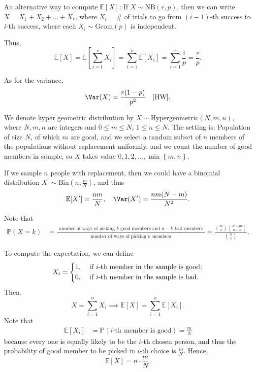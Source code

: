 An alternative way to compute \(\mathbb{E} [X]\): If \(X \sim \mathrm{NB}(r, p) \), then we can write \(X = X_1 + X_2 + \dots + X_r\), where \(X_i = \#\) of trials to go from \((i-1)\)-th success to \(i\)-th success, where each \(X_i \sim \mathrm{Geom}(p) \) is independent. 

Thus, 
\[
    \mathbb{E} [X] = \mathbb{E} \left[ \sum_{i=1}^r X_i  \right] = \sum_{i=1}^r \mathbb{E} [X_i] = \sum_{i=1}^r \frac{1}{p} = \frac{r}{p}.   
\]

As for the variance,
\[
    \Var(X) = \frac{r(1 - p)}{p^2} \quad [\text{HW}]. 
\]

\begin{definition}
    We denote hyper geometric distribution by \(X \sim \mathrm{Hypergeometric}(N, m, n) \), where \(N, m, n\) are integers and \(0 \le m \le N\), \(1 \le n \le N\). The setting is: Population of size \(N\), of which \(m\) are good, and we select a random subset of \(n\) members of the populations without replacement uniformly, and we count the number of good members in sample, so \(X\) takes value \(0, 1, 2, \dots , \min \left\{ m, n \right\} \).      
\end{definition}

\begin{observation}
    If we sample \(n\) people with replacement, then we could have a binomial distribution \(X^{\prime} \sim \mathrm{Bin}(n, \frac{m}{N})\), and thus 
    \[
        \mathbb{E} [X^{\prime} ] = \frac{nm}{N}, \quad \Var(X^{\prime} ) = \frac{nm(N - m)}{N^2}.
    \]  
\end{observation}

Note that 
\begin{align*}
    \mathbb{P} (X = k) &= \frac{\substack{\text{number of ways of picking } k \text{ good members and } n - k \text{ bad members}   } }{\substack{\text{number of ways of picking } n \text{ members}  }} = \frac{\binom{m}{k} \binom{N - m}{n - k}}{\binom{N}{n}}.
\end{align*}

To compute the expectation, we can define 
\[
    X_i = \begin{dcases}
        1, &\text{ if } i\text{-th member in the sample is good}  ;\\
        0, &\text{ if } i\text{-th member in the sample is bad}  .
    \end{dcases}
\]
Then,
\[
    X = \sum_{i=1}^n X_i \implies \mathbb{E} [X] = \sum_{i=1}^n \mathbb{E} [X_i].  
\]
Note that 
\begin{align*}
    \mathbb{E} [X_i] &= \mathbb{P} (i\text{-th member is good} ) = \frac{m}{N}
\end{align*}
because every one is equally likely to  be the \(i\)-th chosen person, and thus the probability of good member to be picked in \(i\)-th choice is \(\frac{m}{N}\). Hence,
\[
    \mathbb{E} [X] = n \cdot \frac{m}{N}.
\] 

